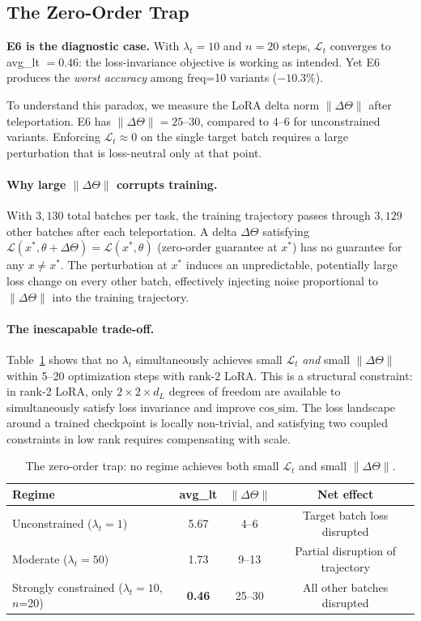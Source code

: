\documentclass{article}
\newcommand{\cossim}{\mathrm{cos\_sim}}
\begin{document}
\subsection{The Zero-Order Trap}

\textbf{E6 is the diagnostic case.}
With $\lambda_t = 10$ and $n=20$ steps, $\mathcal{L}_t$ converges to avg\_lt $= 0.46$:
the loss-invariance objective is working as intended.
Yet E6 produces the \emph{worst accuracy} among freq=10 variants ($-10.3\%$).

To understand this paradox, we measure the LoRA delta norm $\|\Delta\Theta\|$ after teleportation.
E6 has $\|\Delta\Theta\| = 25$--$30$, compared to $4$--$6$ for unconstrained variants.
Enforcing $\mathcal{L}_t \approx 0$ on the single target batch requires a large perturbation
that is loss-neutral only at that point.

\paragraph{Why large $\|\Delta\Theta\|$ corrupts training.}
With $3{,}130$ total batches per task, the training trajectory passes through
$3{,}129$ other batches after each teleportation.
A delta $\Delta\Theta$ satisfying $\mathcal{L}(x^*, \theta + \Delta\Theta) = \mathcal{L}(x^*, \theta)$
(zero-order guarantee at $x^*$) has no guarantee for any $x \neq x^*$.
The perturbation at $x^*$ induces an unpredictable, potentially large loss change
on every other batch, effectively injecting noise proportional to $\|\Delta\Theta\|$
into the training trajectory.

\paragraph{The inescapable trade-off.}
Table~\ref{tab:trap} shows that no $\lambda_t$ simultaneously achieves small $\mathcal{L}_t$
\emph{and} small $\|\Delta\Theta\|$ within 5--20 optimization steps with rank-2 LoRA.
This is a structural constraint: in rank-2 LoRA, only $2 \times 2 \times d_L$ degrees of
freedom are available to simultaneously satisfy loss invariance and improve $\cossim$.
The loss landscape around a trained checkpoint is locally non-trivial, and satisfying
two coupled constraints in low rank requires compensating with scale.

\begin{table}[h]
\centering
\caption{The zero-order trap: no regime achieves both small $\mathcal{L}_t$ and small $\|\Delta\Theta\|$.}
\label{tab:trap}
\begin{tabular}{lccc}
\toprule
Regime & avg\_lt & $\|\Delta\Theta\|$ & Net effect \\
\midrule
Unconstrained ($\lambda_t=1$)           & 5.67 & 4--6   & Target batch loss disrupted \\
Moderate ($\lambda_t=50$)               & 1.73 & 9--13  & Partial disruption of trajectory \\
Strongly constrained ($\lambda_t=10$, $n$=20) & \textbf{0.46} & 25--30 & All other batches disrupted \\
\bottomrule
\end{tabular}
\end{table}
\end{document}

